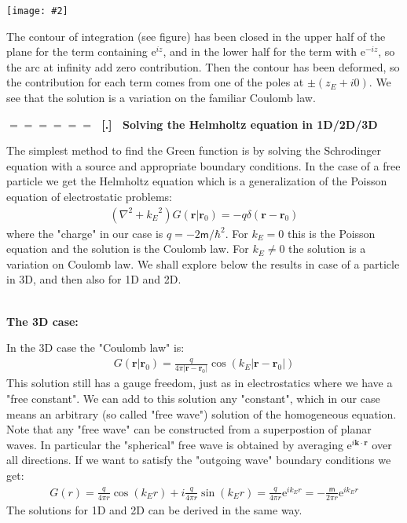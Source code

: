 \documentclass[onecolumn,fleqn]{revtex4}
\newcommand{\eexp}{\mathrm{e}^}
\newcommand{\mass}{\mathsf{m}}
\newcommand{\putgraph}[2][0.30\hsize]{\texttt{[image: \#2]}}
\newcommand{\beq}{\begin{eqnarray}}
\newcommand{\eeq}{\end{eqnarray}}
\renewcommand{\thesubsection}{\arabic{subsection}}
\renewcommand{\thesubsubsection}{\arabic{subsubsection}}
\newcommand{\sheadC}[1]
{
\addtocounter{subsubsection}{1}
\vspace{5mm}
{\Large\bf $=\!=\!=\!=\!=\!=\;$ [\thesubsection.\thesubsubsection] \ #1}  
\nopagebreak
\phantomsection
}
\begin{document}
\begin{center}
\putgraph[0.4\hsize]{GreenComplexIntegral}
\end{center}

The contour of integration (see figure) has been closed 
in the upper half of the plane for the term containing $\eexp{iz}$,  
and in the lower half for the term with $\eexp{-iz}$, 
so the arc at infinity add zero contribution. 
Then the contour has been deformed, so the contribution for 
each term comes from one of the poles at $\pm(z_E+i0)$. 
We see that the solution is a variation on the familiar Coulomb law.





\sheadC{Solving the Helmholtz equation in 1D/2D/3D}


The simplest method to find the Green function 
is by solving the Schrodinger equation with 
a source and appropriate boundary conditions. 
In the case of a free particle we get 
the Helmholtz equation which is a generalization 
of the Poisson equation of electrostatic problems:  
\beq
(\nabla^2 +{k_E}^2)G(\mathbf{r}|\mathbf{r}_0)=
-q\delta(\mathbf{r}-\mathbf{r}_0)
\eeq
where the "charge" in our case is $q=-2\mass/\hbar^2$. 
For $k_E=0$ this is the Poisson equation 
and the solution is the Coulomb law. 
For $k_E\neq0$ the solution is a variation on Coulomb law.
We shall explore below the results in case of 
a particle in 3D, and then also for 1D and 2D.    



\ \\
{\bf The 3D case:}

In the 3D case the "Coulomb law" is:
\beq
G(\mathbf{r}|\mathbf{r}_0)=
\frac{q}{4\pi |\mathbf{r}-\mathbf{r}_0|}\cos(k_E|\mathbf{r}-\mathbf{r}_0|)
\eeq
This solution still has a gauge freedom, just as in electrostatics where 
we have a "free constant". We can add to this solution any "constant", which in our case means 
an arbitrary (so called "free wave") solution of the homogeneous equation. 
Note that any "free wave" can be constructed from a superpostion of planar waves.   
In particular the "spherical" free wave is obtained 
by averaging $\eexp{i\mathbf{k} \cdot \mathbf{r}}$ 
over all directions. If we want to satisfy 
the "outgoing wave" boundary conditions we get:  
\beq
G(r)=\frac{q}{4\pi r}\cos(k_E r)+i\frac{q}{4\pi r}\sin(k_E r)=
\frac{q}{4\pi r}\eexp{ik_Er} = -\frac{\mass}{2\pi r}\eexp{ik_Er}
\eeq
The solutions for 1D and 2D can be derived in the same way.
\end{document}
